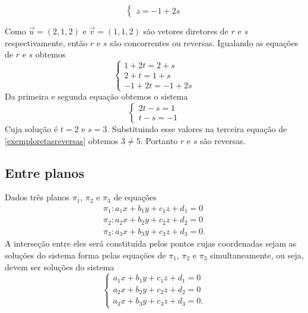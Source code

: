 \begin{exemplos}
\begin{enumerate}
\[\begin{cases}
                z = -1 + 2s
            \end{cases}
        \]
        \begin{solucao}
            Como $\vec{u} = (2,1,2)$ e $\vec{v} = (1,1,2)$ são vetores diretores de $r$ e $s$ respectivamente, então $r$ e $s$ são concorrentes ou reversas. Igualando as equações de $r$ e $s$ obtemos
            \begin{equation}\label{exemploretasreversas}
                \begin{cases}
                    1 + 2t = 2 + s\\
                    2 + t = 1 + s\\
                    -1 + 2t = -1 + 2s
                \end{cases}
            \end{equation}
            Da primeira e segunda equação obtemos o sistema
            \[
                \begin{cases}
                    2t - s = 1\\
                    t - s = -1
                \end{cases}
            \]
            Cuja solução é $t = 2$ e $s = 3$. Substituindo esse valores na terceira equação de \eqref{exemploretasreversas} obtemos $3 \ne 5$. Portanto $r$ e $s$ são reversas.
        \end{solucao}
    \end{enumerate}
\end{exemplos}

\subsection{Entre planos} %
\label{sub:entre_planos}
Dados três planos $\pi_1$, $\pi_2$ e $\pi_3$ de equações
\begin{align*}
    \pi_1 : a_1x + b_1y + c_1z + d_1 = 0\\
    \pi_2 : a_2x + b_2y + c_2z + d_2 = 0\\
    \pi_3 : a_3x + b_3y + c_3z + d_3 = 0.
\end{align*}
A interseção entre eles será constituída pelos pontos cujas coordenadas sejam as soluções do sistema forma pelas equações de $\pi_1$, $\pi_2$ e $\pi_3$ simultaneamente, ou seja, devem ser soluções do sistema
\[
    \begin{cases}
        a_1x + b_1y + c_1z + d_1 = 0\\
        a_2x + b_2y + c_2z + d_2 = 0\\
        a_3x + b_3y + c_3z + d_3 = 0.
    \end{cases}
\]

